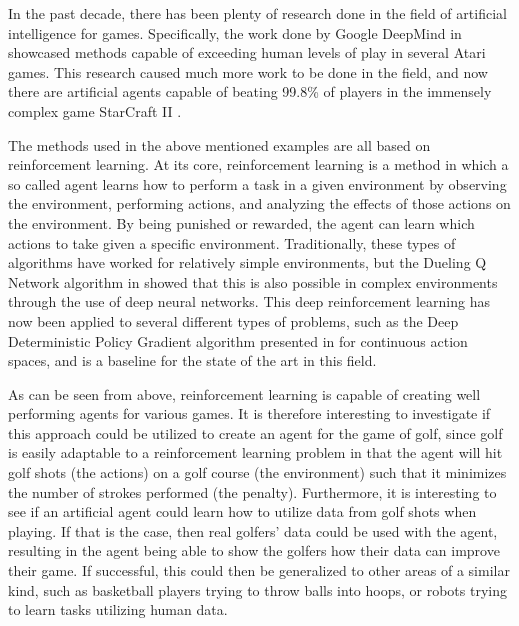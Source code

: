 \documentclass{kththesis}
\begin{document}
In the past decade, there has been plenty of research done in the field of artificial intelligence for games. Specifically, the work done by Google DeepMind in \textcite{mnih2015human} showcased methods capable of exceeding human levels of play in several Atari games. This research caused much more work to be done in the field, and now there are artificial agents capable of beating 99.8\% of players in the immensely complex game StarCraft II \parencite{vinyals2019grandmaster}. 

The methods used in the above mentioned examples are all based on reinforcement learning. At its core, reinforcement learning is a method in which a so called agent learns how to perform a task in a given environment by observing the environment, performing actions, and analyzing the effects of those actions on the environment. By being punished or rewarded, the agent can learn which actions to take given a specific environment. Traditionally, these types of algorithms have worked for relatively simple environments, but the Dueling Q Network algorithm in \textcite{mnih2015human} showed that this is also possible in complex environments through the use of deep neural networks. This deep reinforcement learning has now been applied to several different types of problems, such as the Deep Deterministic Policy Gradient algorithm presented in \textcite{lillicrap2015continuous} for continuous action spaces, and is a baseline for the state of the art in this field.

As can be seen from above, reinforcement learning is capable of creating well performing agents for various games. It is therefore interesting to investigate if this approach could be utilized to create an agent for the game of golf, since golf is easily adaptable to a reinforcement learning problem in that the agent will hit golf shots (the actions) on a golf course (the environment) such that it minimizes the number of strokes performed (the penalty). Furthermore, it is interesting to see if an artificial agent could learn how to utilize data from golf shots when playing. If that is the case, then real golfers' data could be used with the agent, resulting in the agent being able to show the golfers how their data can improve their game. If successful, this could then be generalized to other areas of a similar kind, such as basketball players trying to throw balls into hoops, or robots trying to learn tasks utilizing human data.
\end{document}
